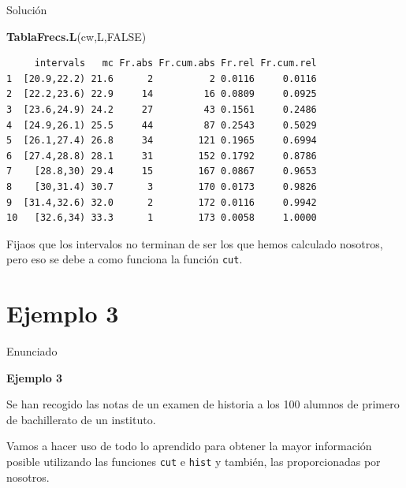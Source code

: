 \documentclass[
  ignorenonframetext,
]{beamer}
\newenvironment{Shaded}{\begin{snugshade}}{\end{snugshade}}
\newcommand{\KeywordTok}[1]{\textcolor[rgb]{0.13,0.29,0.53}{\textbf{#1}}}
\newcommand{\NormalTok}[1]{#1}
\newcommand{\OtherTok}[1]{\textcolor[rgb]{0.56,0.35,0.01}{#1}}
\begin{document}
\begin{frame}[fragile]{Solución}
\protect\hypertarget{soluciuxf3n-14}{}

\begin{Shaded}
\begin{Highlighting}[]
\KeywordTok{TablaFrecs.L}\NormalTok{(cw,L,}\OtherTok{FALSE}\NormalTok{)}
\end{Highlighting}
\end{Shaded}

\begin{verbatim}
     intervals   mc Fr.abs Fr.cum.abs Fr.rel Fr.cum.rel
1  [20.9,22.2) 21.6      2          2 0.0116     0.0116
2  [22.2,23.6) 22.9     14         16 0.0809     0.0925
3  [23.6,24.9) 24.2     27         43 0.1561     0.2486
4  [24.9,26.1) 25.5     44         87 0.2543     0.5029
5  [26.1,27.4) 26.8     34        121 0.1965     0.6994
6  [27.4,28.8) 28.1     31        152 0.1792     0.8786
7    [28.8,30) 29.4     15        167 0.0867     0.9653
8    [30,31.4) 30.7      3        170 0.0173     0.9826
9  [31.4,32.6) 32.0      2        172 0.0116     0.9942
10   [32.6,34) 33.3      1        173 0.0058     1.0000
\end{verbatim}

Fijaos que los intervalos no terminan de ser los que hemos calculado
nosotros, pero eso se debe a como funciona la función \texttt{cut}.

\end{frame}

\hypertarget{ejemplo-3}{%
\section{Ejemplo 3}\label{ejemplo-3}}

\begin{frame}[fragile]{Enunciado}
\protect\hypertarget{enunciado-2}{}

\textbf{Ejemplo 3}

Se han recogido las notas de un examen de historia a los 100 alumnos de
primero de bachillerato de un instituto.

Vamos a hacer uso de todo lo aprendido para obtener la mayor información
posible utilizando las funciones \texttt{cut} e \texttt{hist} y también,
las proporcionadas por nosotros.

\end{frame}
\end{document}

